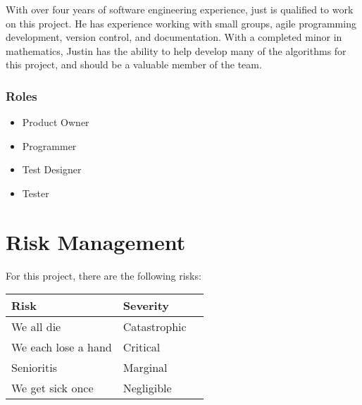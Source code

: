 \documentclass[12pt]{article}
\begin{document}
With over four years of software engineering experience, just is qualified to
work on this project. He has experience working with small groups, agile
programming development, version control, and documentation. With a completed
minor in mathematics, Justin has the ability to help develop many of the
algorithms for this project, and should be a valuable member of the team.

\subsubsection{Roles}
\begin{itemize}
\item Product Owner
\item Programmer
\item Test Designer
\item Tester
\end{itemize}


\section{Risk Management}

For this project, there are the following risks:

%
%

\begin{center}
\begin{tabularx}{\textwidth}{|X|l|l|}
    \hline \textbf{Risk} & \textbf{Severity} \\
    \hline We all die & \color{Red}Catastrophic \\
    \hline We each lose a hand & \color{Orange}Critical \\
    \hline Senioritis & \color{Yellow}Marginal \\
    \hline We get sick once & \color{Green}Negligible \\
    \hline
\end{tabularx}
\end{center}
\end{document}
